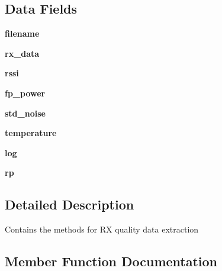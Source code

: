 \subsection*{Data Fields}
\begin{DoxyCompactItemize}
\item 
\mbox{\label{classread_r_s_s_i_1_1_r_s_s_i_a2ff994e16bf9521154de4cf659a3b689}} 
{\bfseries filename}
\item 
\mbox{\label{classread_r_s_s_i_1_1_r_s_s_i_a92802dc5d2939aa879cedfa47a76e7db}} 
{\bfseries rx\+\_\+data}
\item 
\mbox{\label{classread_r_s_s_i_1_1_r_s_s_i_affaf51bc4fc62ee1757230a1b7835393}} 
{\bfseries rssi}
\item 
\mbox{\label{classread_r_s_s_i_1_1_r_s_s_i_ac19a04399a4ed06221ff1900f7007364}} 
{\bfseries fp\+\_\+power}
\item 
\mbox{\label{classread_r_s_s_i_1_1_r_s_s_i_a7911b95104cafd05c10b65fd6d4a7b2f}} 
{\bfseries std\+\_\+noise}
\item 
\mbox{\label{classread_r_s_s_i_1_1_r_s_s_i_ab67dc6cccbf6aeaeeeef8690bacd403c}} 
{\bfseries temperature}
\item 
\mbox{\label{classread_r_s_s_i_1_1_r_s_s_i_ab09a63eb35b270b5cdbead1983ebdccb}} 
{\bfseries log}
\item 
\mbox{\label{classread_r_s_s_i_1_1_r_s_s_i_a3eca7195563a4c365bb41c312d8f7d3c}} 
{\bfseries rp}
\end{DoxyCompactItemize}


\subsection{Detailed Description}
\begin{DoxyVerb}Contains the methods for RX quality data extraction\end{DoxyVerb}
 

\subsection{Member Function Documentation}
\mbox{\label{classread_r_s_s_i_1_1_r_s_s_i_a7f770c7daa5311635963ea5110c357fb}} 
